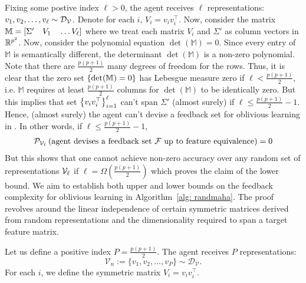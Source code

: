 Fixing some postive index $\ell > 0$, the agent receives $\ell$ representations: $v_1,v_2,\ldots, v_{\ell} \sim {\mathcal{D}}_{{\mathcal{V}}}$. Denote for each $i$, $V_i = v_iv_i^{\top}$. Now, consider the matrix $\mathbb{M} = \left[ \Sigma' \quad V_1 \quad \ldots V_\ell\right]$
where we treat each matrix $V_i$ and $\Sigma'$ as column vectors in $\mathbb{R}^{p^2}$. Now, consider the polynomial equation $\det(\mathbb{M}) = 0$. Since every entry of $\mathbb{M}$ is semantically different, the determinant $\det(\mathbb{M})$ is a non-zero polynomial. Note that there are $\frac{p(p+1)}{2}$ many degrees of freedom for the rows. Thus, it is clear that the zero set $\left\{\det(\mathbb{M}) = 0\right\}$ has Lebesgue measure zero if $\ell < \frac{p(p+1)}{2}$, i.e. $\mathbb{M}$ requires at least $\frac{p(p+1)}{2}$ columns for $\det(\mathbb{M})$ to be identically zero. But this implies that set $\left\{v_iv_i^{\top}\right\}_{i=1}^\ell$ can't span $\Sigma'$ (almost surely) if $\ell \le \frac{p(p+1)}{2} - 1$.
Hence, (almost surely) the agent can't devise a feedback set for oblivious learning in .
In other words, if $\ell \le \frac{p(p+1)}{2} - 1$,
\begin{align*}
    {\mathcal{P}}_{{\mathcal{V}}_\ell} \left( { \textnormal{agent devises} \textnormal{ a feedback set } {\mathcal{F}} \textnormal{ up to feature equivalence}} \right)  = 0
\end{align*}
But this shows that one cannot achieve non-zero accuracy over any random set of representations ${\mathcal{V}}_{\ell}$ if $\ell = \Omega(\frac{p(p+1)}{2})$ which proves the claim of the lower bound.
\fi
We aim to establish both upper and lower bounds on the feedback complexity for oblivious learning in Algorithm~\ref{alg: randmaha}. The proof revolves around the linear independence of certain symmetric matrices derived from random representations and the dimensionality required to span a target feature matrix.

Let us define a positive index \( P = \frac{p(p+1)}{2} \). The agent receives \( P \) representations:
\[
\mathcal{V}_n := \{v_1, v_2, \ldots, v_P\} \sim \mathcal{D}_{\mathcal{V}}.
\]
For each \( i \), we define the symmetric matrix \( V_i = v_i v_i^{\top} \).

